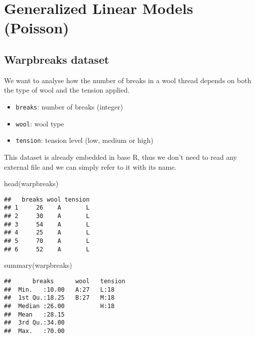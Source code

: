\documentclass[
  oneside]{book}
\newenvironment{Shaded}{\begin{snugshade}}{\end{snugshade}}
\newcommand{\FunctionTok}[1]{\textcolor[rgb]{0.00,0.00,0.00}{#1}}
\newcommand{\NormalTok}[1]{#1}
\providecommand{\tightlist}{%
  \setlength{\itemsep}{0pt}\setlength{\parskip}{0pt}}
\begin{document}
\hypertarget{generalized-linear-models-poisson}{%
\chapter{Generalized Linear Models (Poisson)}\label{generalized-linear-models-poisson}}

\hypertarget{warpbreaks-dataset}{%
\section{Warpbreaks dataset}\label{warpbreaks-dataset}}

We want to analyse how the number of breaks in a wool thread
depends on both the type of wool and the tension applied.

\begin{itemize}
\tightlist
\item
  \texttt{breaks}: number of breaks (integer)
\item
  \texttt{wool}: wool type
\item
  \texttt{tension}: tension level (low, medium or high)
\end{itemize}

This dataset is already embedded in base R, thus we don't need
to read any external file and we can simply refer to it
with its name.

\begin{Shaded}
\begin{Highlighting}[]
\FunctionTok{head}\NormalTok{(warpbreaks)}
\end{Highlighting}
\end{Shaded}

\begin{verbatim}
##   breaks wool tension
## 1     26    A       L
## 2     30    A       L
## 3     54    A       L
## 4     25    A       L
## 5     70    A       L
## 6     52    A       L
\end{verbatim}

\begin{Shaded}
\begin{Highlighting}[]
\FunctionTok{summary}\NormalTok{(warpbreaks)}
\end{Highlighting}
\end{Shaded}

\begin{verbatim}
##      breaks      wool   tension
##  Min.   :10.00   A:27   L:18   
##  1st Qu.:18.25   B:27   M:18   
##  Median :26.00          H:18   
##  Mean   :28.15                 
##  3rd Qu.:34.00                 
##  Max.   :70.00
\end{verbatim}
\end{document}
